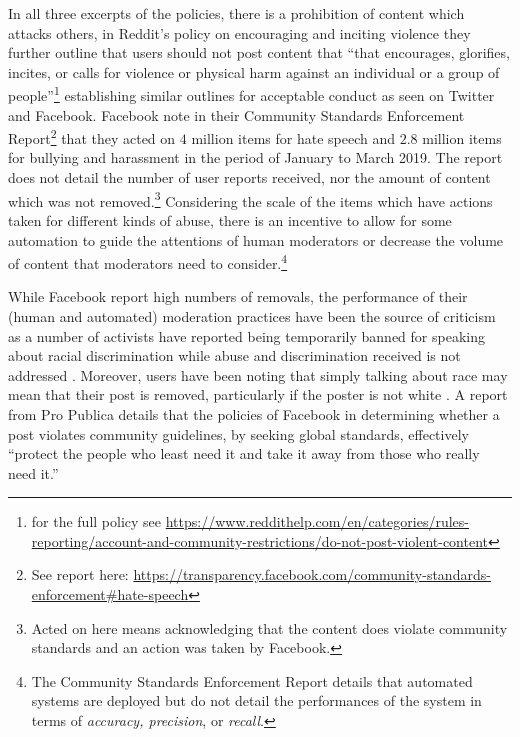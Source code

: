 In all three excerpts of the policies, there is a prohibition of content which attacks others, in Reddit's policy on encouraging and inciting violence they further outline that users should not post content that ``that encourages, glorifies, incites, or calls for violence or physical harm against an individual or a group of people''\footnote{for the full policy see \url{https://www.reddithelp.com/en/categories/rules-reporting/account-and-community-restrictions/do-not-post-violent-content}}
establishing similar outlines for acceptable conduct as seen on Twitter and Facebook. Facebook note in their Community Standards Enforcement Report\footnote{See report here: \url{https://transparency.facebook.com/community-standards-enforcement\#hate-speech}} that they acted on $4$ million items for hate speech and $2.8$ million items for bullying and harassment in the period of January to March 2019. The report does not detail the number of user reports received, nor the amount of content which was not removed.\footnote{Acted on here means acknowledging that the content does violate community standards and an action was taken by Facebook.} Considering the scale of the items which have actions taken for different kinds of abuse, there is an incentive to allow for some automation to guide the attentions of human moderators or decrease the volume of content that moderators need to consider.\footnote{The Community Standards Enforcement Report details that automated systems are deployed but do not detail the performances of the system in terms of \textit{accuracy, precision}, or \textit{recall}.}

While Facebook report high numbers of removals, the performance of their (human and automated) moderation practices have been the source of criticism as a number of activists have reported being temporarily banned for speaking about racial discrimination while abuse and discrimination received is not addressed \citep{Sharif:2019}.
Moreover, users have been noting that simply talking about race may mean that their post is removed, particularly if the poster is not white \citep{Guynn:2019}. A report from Pro Publica details that the policies of Facebook in determining whether a post violates community guidelines, by seeking global standards, effectively ``protect the people who least need it and take it away from those who really need it.'' \citep{Angwin:2017}


